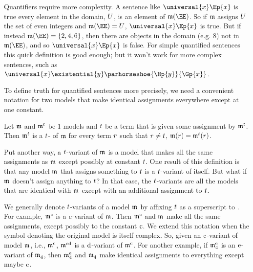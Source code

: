 Quantifiers require more complexity.
A sentence like $\universal{\variable{x}}\Ep{\variable{x}}$ is true \Iff every element in the domain, $U$, is an element of $\IntA(\EE)$.
So if $\mathfrak{m}$ assigns $U$ the set of even integers and $\IntA(\EE)=\integer{U}$, $\universal{\variable{x}}\Ep{\variable{x}}$ is true.
But if instead $\IntA(\EE)=\{2, 4, 6\}$, then there are objects in the domain (e.g. $8$) not in $\IntA(\EE)$, and so $\universal{\variable{x}}\Ep{\variable{x}}$ is false.
For simple quantified sentences this quick definition is good enough; but it won't work for more complex sentences, such as $\universal{\variable{x}}\existential{\variable{y}}\parhorseshoe{\Hp{\variable{y}}}{\Gp{\variable{x}}}$.

To define truth for quantified sentences more precisely, we need a convenient notation for two models that make identical assignments everywhere except at one constant.

\begin{majorILnc}{}
	Let $\mathfrak{m}$ and $\mathfrak{m}^{t}$ be \GQL{}1 models and $t$ be a term that is given some assignment by $\mathfrak{m}^{t}$. Then $\mathfrak{m}^{t}$ is a $t$- of $\mathfrak{m}$ \Iff for every term $r$ such that $r\not=t$, $\mathfrak{m}(r)=\mathfrak{m}^{t}(r)$.
\end{majorILnc}
\noindent{}Put another way, a $t$-variant of $\As{}{}$ is a model that makes all the same assignments as $\As{}{}$ except possibly at constant $t$.
One result of this definition is that any model $\As{}{}$ that assigns something to $t$ is a $t$-variant of itself.
But what if $\As{}{}$ doesn't assign anything to $t$? In that case, the $t$-variants are all the models that are identical with $\As{}{}$ except with an additional assignment to $t$.

We generally denote $t$-variants of a model $\As{}{}$ by affixing $t$ as a superscript to \mention{$\As{}{}$}. For example, $\mathfrak{m^{\mathrm{\mathrm{c}}}_{\mathrm{}}}$ is a $\mathrm{c}$-variant of $\As{}{}$.
Then $\mathfrak{m^{\mathrm{\mathrm{c}}}_{\mathrm{}}}$ and $\As{}{}$ make all the same assignments, except possibly to the constant $\mathrm{c}$.
We extend this notation when the symbol denoting the original model is itself complex.
So, given an $\mathrm{c}$-variant of model $\As{}{}$, i.e., $\mathfrak{m^{\mathrm{\mathrm{c}}}_{\mathrm{}}}$, $\mathfrak{m^{\mathrm{\mathrm{cd}}}_{\mathrm{}}}$ is a $\mathrm{d}$-variant of $\mathfrak{m^{\mathrm{\mathrm{c}}}_{\mathrm{}}}$.  For another example, if $\mathfrak{m^{\mathrm{\mathrm{e}}}_{\mathrm{4}}}$ is an $\mathrm{e}$-variant of $\mathfrak{m^{\mathrm{}}_{\mathrm{4}}}$, then $\mathfrak{m^{\mathrm{\mathrm{e}}}_{\mathrm{4}}}$ and $\mathfrak{m^{\mathrm{}}_{\mathrm{4}}}$ make identical assignments to everything except maybe $\mathrm{e}$. 

